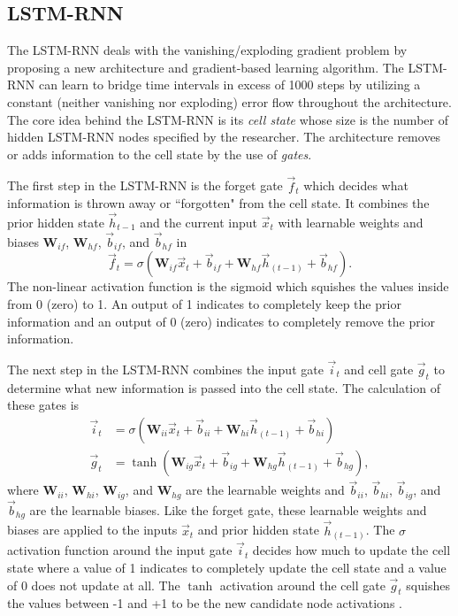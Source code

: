 \subsection{LSTM-RNN}
The \ac{LSTM-RNN} \cite{LSTM} deals with the vanishing/exploding gradient problem by proposing a new architecture and gradient-based learning algorithm. The \ac{LSTM-RNN} can learn to bridge time intervals in excess of 1000 steps by utilizing a constant (neither vanishing nor exploding) error flow throughout the architecture. The core idea behind the \ac{LSTM-RNN} is its \emph{cell state} whose size is the number of hidden \ac{LSTM-RNN} nodes specified by the researcher. The architecture removes or adds information to the cell state by the use of \emph{gates}.

The first step in the \ac{LSTM-RNN} is the forget gate $\vec{f}_{t}$ which decides what information is thrown away or ``forgotten" from the cell state. It combines the prior hidden state $\vec{h}_{t-1}$ and the current input $\vec{x}_{t}$ with learnable weights and biases $\textbf{W}_{if}$, $\textbf{W}_{hf}$, $\vec{b}_{if}$, and $\vec{b}_{hf}$ in
\begin{equation} \label{eq:LSTM_forget_gate}
	\vec{f}_{t} = \sigma\left(\textbf{W}_{if} \vec{x}_{t} + \vec{b}_{if} + \textbf{W}_{hf} \vec{h}_{\left(t-1\right)} + \vec{b}_{hf}\right).
\end{equation}
The non-linear activation function is the sigmoid which squishes the values inside from 0 (zero) to 1. An output of 1 indicates to completely keep the prior information and an output of 0 (zero) indicates to completely remove the prior information.

The next step in the \ac{LSTM-RNN} combines the input gate $\vec{i}_{t}$ and cell gate $\vec{g}_{t}$ to determine what new information is passed into the cell state. The calculation of these gates is 
\begin{align}
\vec{i}_{t} &= \sigma\left(\textbf{W}_{ii} \vec{x}_{t} + \vec{b}_{ii} + \textbf{W}_{hi} \vec{h}_{\left(t-1\right)} + \vec{b}_{hi}\right) \label{eq:LSTM_input_gate} \\
\vec{g}_{t} &= \tanh\left(\textbf{W}_{ig} \vec{x}_{t} + \vec{b}_{ig} + \textbf{W}_{hg} \vec{h}_{\left(t-1\right)} + \vec{b}_{hg}\right), \label{eq:LSTM_cell_gate}
\end{align}
where $\textbf{W}_{ii}$, $\textbf{W}_{hi}$, $\textbf{W}_{ig}$, and $\textbf{W}_{hg}$ are the learnable weights and $\vec{b}_{ii}$, $\vec{b}_{hi}$, $\vec{b}_{ig}$, and $\vec{b}_{hg}$ are the learnable biases. Like the forget gate, these learnable weights and biases are applied to the inputs $\vec{x}_{t}$ and prior hidden state $\vec{h}_{\left(t-1\right)}$. The $\sigma$ activation function around the input gate $\vec{i}_{t}$ decides how much to update the cell state where a value of 1 indicates to completely update the cell state and a value of 0 does not update at all. The $\tanh$ activation around the cell gate $\vec{g}_{t}$ squishes the values between -1 and +1 to be the new candidate node activations \cite{olah}.

